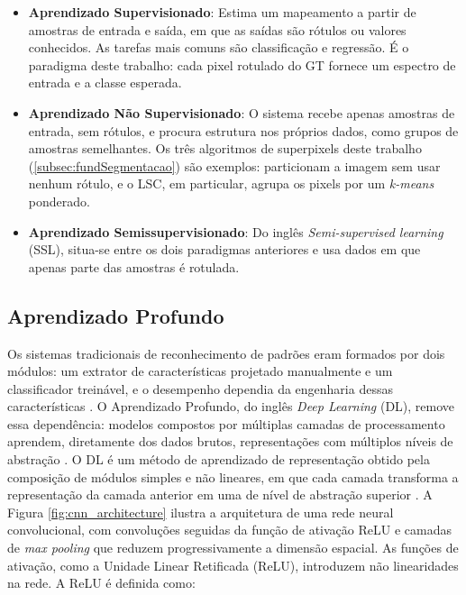 \begin{itemize}
    \item \textbf{Aprendizado Supervisionado}: Estima um mapeamento a partir de amostras de entrada e saída, em que as saídas são rótulos ou valores conhecidos. As tarefas mais comuns são classificação e regressão. É o paradigma deste trabalho: cada pixel rotulado do GT fornece um espectro de entrada e a classe esperada.

    \item \textbf{Aprendizado Não Supervisionado}: O sistema recebe apenas amostras de entrada, sem rótulos, e procura estrutura nos próprios dados, como grupos de amostras semelhantes. Os três algoritmos de superpixels deste trabalho (\autoref{subsec:fundSegmentacao}) são exemplos: particionam a imagem sem usar nenhum rótulo, e o LSC, em particular, agrupa os pixels por um \textit{k-means} ponderado.

    \item \textbf{Aprendizado Semissupervisionado}: Do inglês \textit{Semi-supervised learning} (SSL), situa-se entre os dois paradigmas anteriores e usa dados em que apenas parte das amostras é rotulada.
\end{itemize}

\subsection{Aprendizado Profundo}

Os sistemas tradicionais de reconhecimento de padrões eram formados por dois módulos: um extrator de características projetado manualmente e um classificador treinável, e o desempenho dependia da engenharia dessas características \cite{DeeplearningLC}. O Aprendizado Profundo, do inglês \textit{Deep Learning} (DL), remove essa dependência: modelos compostos por múltiplas camadas de processamento aprendem, diretamente dos dados brutos, representações com múltiplos níveis de abstração \cite{Asurveyonstate-of-the-artdeeplearningapplicationsandchallenges}. O DL é um método de aprendizado de representação obtido pela composição de módulos simples e não lineares, em que cada camada transforma a representação da camada anterior em uma de nível de abstração superior \cite{DeeplearningLC}. A Figura \ref{fig:cnn_architecture} ilustra a arquitetura de uma rede neural convolucional, com convoluções seguidas da função de ativação ReLU e camadas de \textit{max pooling} que reduzem progressivamente a dimensão espacial. As funções de ativação, como a Unidade Linear Retificada (ReLU), introduzem não linearidades na rede. A ReLU é definida como:

